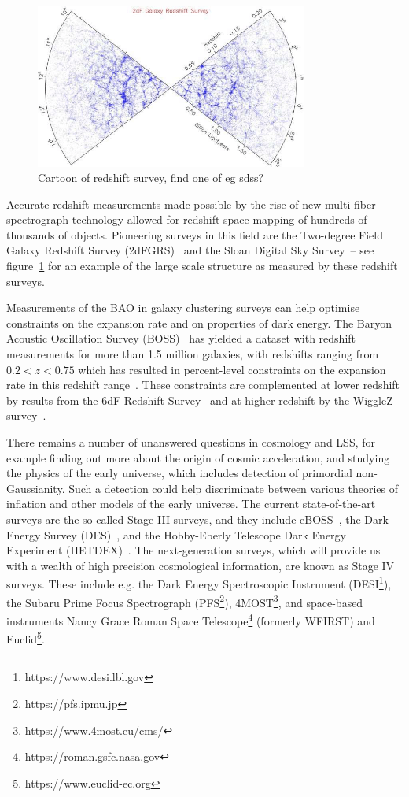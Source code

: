 \begin{figure}[ht]
	\centering
	\includegraphics[width=0.8\textwidth]{fig/placeholder_redshiftsurvey.png}
	\caption{Cartoon of redshift survey, find one of eg sdss?}
	\label{fig:redshiftsurveypicture}
\end{figure}

Accurate redshift measurements made possible by the rise of new multi-fiber spectrograph technology allowed for redshift-space mapping of hundreds of thousands of objects. Pioneering surveys in this field are the Two-degree Field Galaxy Redshift Survey (2dFGRS)~\cite{2DFGRS:2001zay} and the Sloan Digital Sky Survey~\cite{SDSS:2000hjo}-- see figure~\ref{fig:redshiftsurveypicture} for an example of the large scale structure as measured by these redshift surveys.

Measurements of the BAO in galaxy clustering surveys can help optimise constraints on the expansion rate and on properties of dark energy. The Baryon Acoustic Oscillation Survey (BOSS)~\cite{Dawson:2012} has yielded a dataset with redshift measurements for more than 1.5 million galaxies, with redshifts ranging from $0.2 < z < 0.75$ which has resulted in percent-level constraints on the expansion rate in this redshift range~\cite{BOSS:2016wmc}. These constraints are complemented at lower redshift by results from the 6dF Redshift Survey~\cite{Beutler:2011} and at higher redshift by the WiggleZ survey~\cite{Blake:2011a,Blake:2011b}. 

There remains a number of unanswered questions in cosmology and LSS, for example finding out more about the origin of cosmic acceleration, and studying the physics of the early universe, which includes detection of primordial non-Gaussianity. Such a detection could help discriminate between various theories of inflation and other models of the early universe. The current state-of-the-art surveys are the so-called Stage III surveys, and they include eBOSS~\cite{Dawson:2015wdb}, the Dark Energy Survey (DES)~\cite{DES:2014xto}, and the Hobby-Eberly Telescope Dark Energy Experiment (HETDEX)~\cite{Hill:2008}. 
The next-generation surveys, which will provide us with a wealth of high precision cosmological information, are known as Stage IV surveys. These include e.g. the Dark Energy Spectroscopic Instrument (DESI\footnote{https://www.desi.lbl.gov}), the Subaru Prime Focus Spectrograph (PFS\footnote{https://pfs.ipmu.jp}), 4MOST\footnote{https://www.4most.eu/cms/}, and space-based instruments Nancy Grace Roman Space Telescope\footnote{https://roman.gsfc.nasa.gov} (formerly WFIRST) and Euclid\footnote{https://www.euclid-ec.org}.

